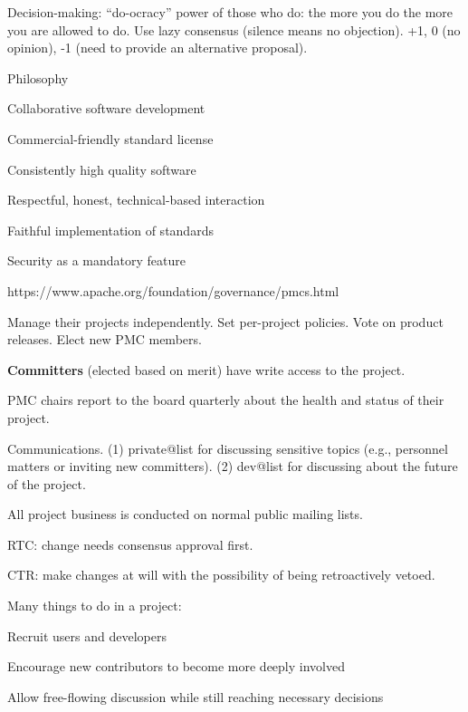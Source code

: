 \documentclass[landscape,30pt]{foils}
\begin{document}
Decision-making: ``do-ocracy'' power of those who do: the more you do the more you are allowed to do.  Use lazy consensus (silence means no objection). +1, 0 (no opinion), -1 (need to provide an alternative proposal).

Philosophy

Collaborative software development

Commercial-friendly standard license

Consistently high quality software

Respectful, honest, technical-based interaction

Faithful implementation of standards

Security as a mandatory feature



https://www.apache.org/foundation/governance/pmcs.html

Manage their projects independently.  Set per-project policies.  Vote on product releases.  Elect new PMC members.

{\bf Committers} (elected based on merit) have write access to the project.

PMC chairs report to the board quarterly about the health and status of their project.

Communications.  (1) private@list for discussing sensitive topics (e.g., personnel matters or inviting new committers). (2) dev@list for discussing about the future of the project.

All project business is conducted on normal public mailing lists.


RTC: change needs consensus approval first.

CTR: make changes at will with the possibility of being retroactively vetoed.



Many things to do in a project:

Recruit users and developers

Encourage new contributors to become more deeply involved

Allow free-flowing discussion while still reaching necessary decisions
\end{document}
